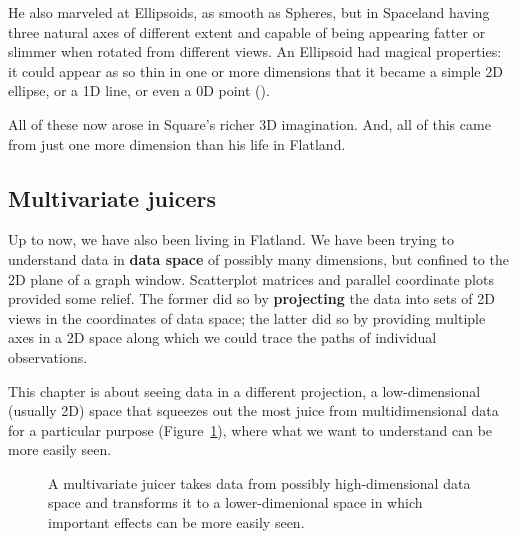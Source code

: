 \documentclass[
  letterpaper,
  10pt,
  krantz2]{krantz}
\begin{document}
He also marveled at Ellipsoids, as smooth as Spheres, but in Spaceland
having three natural axes of different extent and capable of being
appearing fatter or slimmer when rotated from different views. An
Ellipsoid had magical properties: it could appear as so thin in one or
more dimensions that it became a simple 2D ellipse, or a 1D line, or
even a 0D point ().

All of these now arose in Square's richer 3D imagination. And, all of
this came from just one more dimension than his life in Flatland.

\subsection{Multivariate juicers}\label{multivariate-juicers}

Up to now, we have also been living in Flatland. We have been trying to
understand data in \textbf{data space} of possibly many dimensions, but
confined to the 2D plane of a graph window. Scatterplot matrices and
parallel coordinate plots provided some relief. The former did so by
\textbf{projecting} the data into sets of 2D views in the coordinates of
data space; the latter did so by providing multiple axes in a 2D space
along which we could trace the paths of individual observations.

This chapter is about seeing data in a different projection, a
low-dimensional (usually 2D) space that squeezes out the most juice from
multidimensional data for a particular purpose
(Figure~\ref{fig-MV-juicer}), where what we want to understand can be
more easily seen.

\begin{figure}


\caption{\label{fig-MV-juicer}A multivariate juicer takes data from
possibly high-dimensional data space and transforms it to a
lower-dimenional space in which important effects can be more easily
seen.}

\end{figure}%
\end{document}
